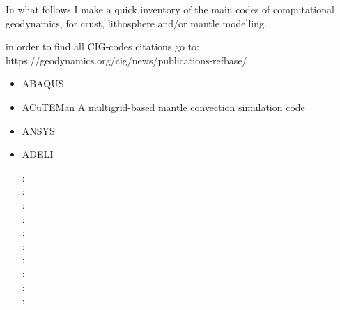 
In what follows I make a quick inventory of the main codes of computational geodynamics, 
for crust, lithosphere and/or mantle modelling.

in order to find all CIG-codes citations go to: https://geodynamics.org/cig/news/publications-refbase/

\begin{itemize}

\item {\codefont ABAQUS} 

{\small
\noindent
\cite{brry01}
\cite{gedh02}
\cite{fumr03}
\cite{hapf06}
\cite{camg07}
\cite{kuhe09}
\cite{makh09}
\cite{camg10}
\cite{nalr12}
\cite{pevp15}
\cite{naam17}
\cite{naam18}
}

\item {\codefont ACuTEMan} 
A multigrid-based mantle convection simulation code

\cite{kame05}
\cite{miko15}
\cite{kamo15}


\item {\codefont ANSYS} 

\cite{nehe06}
\cite{guyr16}

\item {\codefont ADELI} 

\nineteenninetyseven: \cite{hajc97}\\
\twothousandone: \cite{chzh01}\\
\twothousandfour: \cite{gocl04}\\
\twothousandsix: \cite{vech06}\cite{golc06}\\
\twothousandeight: \cite{boht08a}\cite{boht08b}\\
\twothousandtwelve: \cite{gech12}\cite{gigh12}\\
\twothousandthirteen: \cite{wahd13}\\
\twothousandfourteen: \cite{cehg14}\\
\twothousandfifteen: \cite{ceag15}\\
\twothousandeighteen: \cite{cegm18}\cite{gehn18}


\end{itemize}
